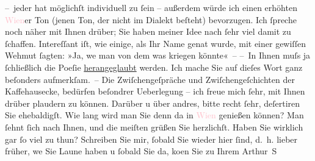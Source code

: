                   – {\pb}jeder hat möglichſt individuell zu ſein – außerdem
               würde ich einen erhöhten \textcolor{pink}{Wien}{}\ledrightnote{\textcolor{pink}{Wien}}er Ton (jenen Ton, der
               nicht im Dialekt beſteht) bevorzugen\strikeout{)}.\pend
           \pstart
           Ich ſpreche noch näher mit Ihnen drüber; Sie haben meiner Idee nach ſehr viel damit
               zu ſchaffen. Intereſſant iſt, wie einige, als Ihr Name gena{\geminationn}t wurde, mit einer gewiſſen Wehmut ſagten: »Ja, we{\geminationn}{ }{\pb}man von dem was kriegen könnte« –\pend
           \pstart
           – In Ihnen muſs ja ſchließlich die Poeſie \uline{herangeglaubt} werden. Ich mache Sie auf dieſes Wort ganz beſonders
               aufmerkſam. – Die Zwiſchengeſpräche und Zwiſchengeſchichten der Kaffehausecke,
               bedürfen beſondrer Ueberlegung – ich freue mich ſehr, mit Ihnen drüber plaudern zu
               können. Darüber u über andres, {\pb}bitte recht ſehr,
               deſertiren Sie ehebaldigſt. Wie lang wird man Sie denn da{\geminationn} in \textcolor{pink}{Wien}{}\ledrightnote{\textcolor{pink}{Wien}} genießen können? Man ſehnt ſich nach
               Ihnen, und die meiſten grüßen Sie herzlichſt. Haben Sie wirklich gar ſo viel zu
               thun?\pend
           \pstart
           Schreiben Sie mir, ſobald Sie wieder hier ſind, d. h. lieber früher, we{\geminationn}{ }Sie Laune haben u ſobald Sie da, ko{\geminationm}en Sie zu\pend
           \pstart Ihrem \spacefill\mbox{Arthur S}\pend{}\endnumbering{}  
      